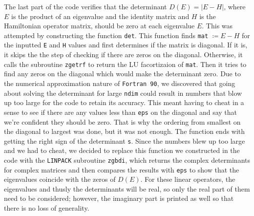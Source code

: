 \documentclass[12pt]{article}
\begin{document}
The last part of the code verifies that the determinant $D(E)=|E-H|$, where $E$ is the product of an eigenvalue and the identity matrix and $H$ is the Hamiltonian operator matrix, should be zero at each eigenvalue $E$.  This was attempted by constructing the function {\tt det}.  This function finds {\tt mat} $\coloneqq E-H$ for the inputted {\tt E} and {\tt H} values and first determines if the matrix is diagonal.  If it is, it skips the the step of checking if there are zeros on the diagonal.  Otherwise, it calls the subroutine {\tt zgetrf} to return the LU facortizaion of {\tt mat}.  Then it tries to find any zeros on the diagonal which would make the determinant zero.  Due to the numerical approximation nature of {\tt Fortran 90}, we discovered that going about solving the determinant for large {\tt ndim} could result in numbers that blow up too large for the code to retain its accuracy.  This meant having to cheat in a sense to see if there are any values less than {\tt eps} on the diagonal and say that we're confident they should be zero.  That is why the ordering from smallest on the diagonal to largest was done, but it was not enough.  The function ends with getting the right sign of the determinant {\tt s}.  Since the numbers blew up too large and we had to cheat, we decided to replace this function we constructed in the code with the {\tt LINPACK} subroutine {\tt zgbdi}, which returns the complex determinants for complex matrices and then compares the results with {\tt eps} to show that the eigenvalues coincide with the zeros of $D(E)$.  For these linear operators, the eigenvalues and thusly the determinants will be real, so only the real part of them need to be considered; however, the imaginary part is printed as well so that there is no loss of generality.
\end{document}
